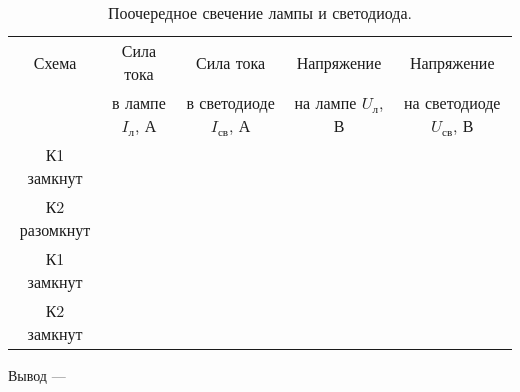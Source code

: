 \begin{table}[h]
    \centering
    \caption{Поочередное свечение лампы и светодиода.}
    \begin{tabular}{|c|c|c|c|c|}
    \hline
        Схема & Сила тока & Сила тока &Напряжение  &Напряжение \\
        & в лампе $I_\text{л}$, А & в светодиоде $I_\text{св}$, А& на лампе $U_\text{л}$, В&на светодиоде $U_\text{св}$, В \\
         \hline
         К1 замкнут& & & & \\
         К2 разомкнут& & & & \\
         \hline
         К1 замкнут& & & & \\
         К2 замкнут& & & & \\
         \hline
    \end{tabular}
    
    \label{tab:3.3}
\end{table}

Вывод --- \hrulefill

\hrulefill

\hrulefill

\newpage


